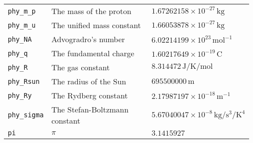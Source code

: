 \begin{landscape}
\begin{center}
\begin{longtable}{|lll|}
{\tt phy\_m\_p} & The mass of the proton & $1.67262158\times10^{-27}\,\mathrm{kg}$ \\
{\tt phy\_m\_u} & The unified mass constant & $1.66053878\times10^{-27}\,\mathrm{kg}$ \\
{\tt phy\_NA} & Advogradro's number & $6.02214199\times10^{23}\,\mathrm{mol}^{-1}$ \\
{\tt phy\_q} & The fundamental charge & $1.60217649\times10^{-19}\,\mathrm{C}$ \\
{\tt phy\_R} & The gas constant & $8.314472\,\mathrm{J}/\mathrm{K}/\mathrm{mol}$ \\
{\tt phy\_Rsun} & The radius of the Sun & $695500000\,\mathrm{m}$ \\
{\tt phy\_Ry} & The Rydberg constant & $2.17987197\times10^{-18}\,\mathrm{m}^{-1}$ \\
{\tt phy\_sigma} & The Stefan-Boltzmann constant & $5.67040047\times10^{-8}\,\mathrm{kg}/\mathrm{s}^{3}/\mathrm{K}^{4}$ \\
{\tt pi} & $\pi$ & $3.1415927$ \\
\hline
\end{longtable}
\end{center}
\end{landscape}

